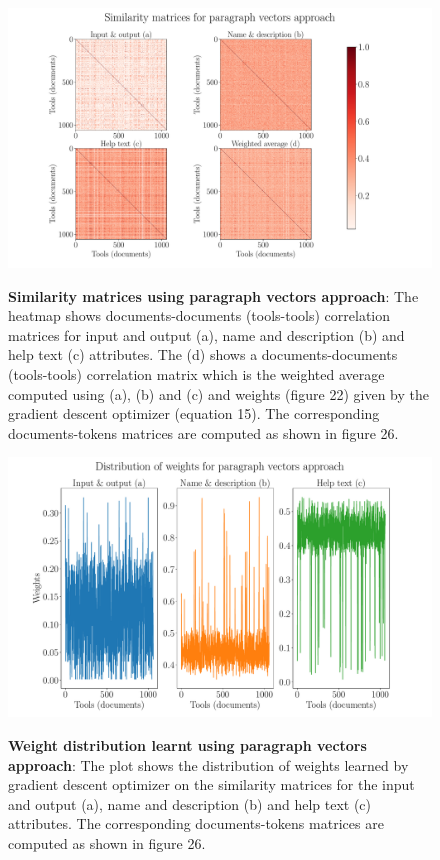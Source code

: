 \begin{figure}[h]
\begin{centering}    
    {\includegraphics[scale=0.35]{figures/Similarity_matrices_doc2vec.pdf}}
    \caption[Similarity matrices using paragraph vectors approach]{\textbf{Similarity matrices using paragraph vectors approach}: The heatmap shows documents-documents (tools-tools) correlation matrices for input and output (a), name and description (b) and help text (c) attributes. The (d) shows a documents-documents (tools-tools) correlation matrix which is the weighted average computed using (a), (b) and (c) and weights (figure 22) given by the gradient descent optimizer (equation 15). The corresponding documents-tokens matrices are computed as shown in figure 26.}
\end{centering}
\end{figure}

\begin{figure}[h]
\begin{centering}
    {\includegraphics[scale=0.35]{figures/Weights_doc2vec.pdf}}
    \caption[Weights distribution for doc2vec]{\textbf{Weight distribution learnt using paragraph vectors approach}: The plot shows the distribution of weights learned by gradient descent optimizer on the similarity matrices for the input and output (a), name and description (b) and help text (c) attributes. The corresponding documents-tokens matrices are computed as shown in figure 26. }
\end{centering}
\end{figure}

